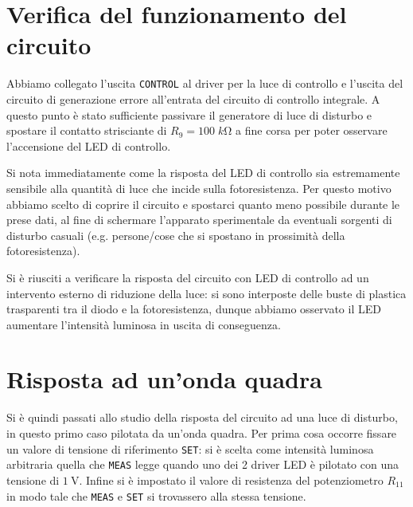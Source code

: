 \documentclass[10pt, a4paper, italian]{article}
\begin{document}
\section{Verifica del funzionamento del circuito}
Abbiamo collegato l'uscita \verb+CONTROL+ al driver per la luce di
controllo e l'uscita del circuito di generazione errore all'entrata del
circuito di controllo integrale.
A questo punto è stato sufficiente passivare il generatore di luce di
disturbo e spostare il contatto strisciante di $R_9 = 100 \; \si{k\ohm}$ a
fine corsa per poter osservare l'accensione del LED di controllo.

Si nota immediatamente come la risposta del LED di controllo sia estremamente
sensibile alla quantità di luce che incide sulla fotoresistenza. Per questo
motivo abbiamo scelto di coprire il circuito e spostarci quanto meno possibile
durante le prese dati, al fine di schermare l'apparato sperimentale da
eventuali sorgenti di disturbo casuali (e.g. persone/cose che si spostano
in prossimità della fotoresistenza).

Si è riusciti a verificare la risposta del circuito con LED di controllo ad un
intervento esterno di riduzione della luce: si sono interposte delle buste di
plastica trasparenti tra il diodo e la fotoresistenza, dunque abbiamo
osservato il LED aumentare l'intensità luminosa in uscita di conseguenza.

\section{Risposta ad un'onda quadra}\label{sec: intsqwresp}
Si è quindi passati allo studio della risposta del circuito ad una luce di
disturbo, in questo primo caso pilotata da un'onda quadra.
Per prima cosa occorre fissare un valore di tensione di riferimento \verb+SET+:
si è scelta come intensità luminosa arbitraria quella che \verb+MEAS+ legge
quando uno dei 2 driver LED è pilotato con una tensione di $\SI{1}{\V}$.
Infine si è impostato il valore di resistenza del potenziometro $R_{11}$ in
modo tale che \verb+MEAS+ e \verb+SET+ si trovassero alla stessa tensione.
\end{document}
